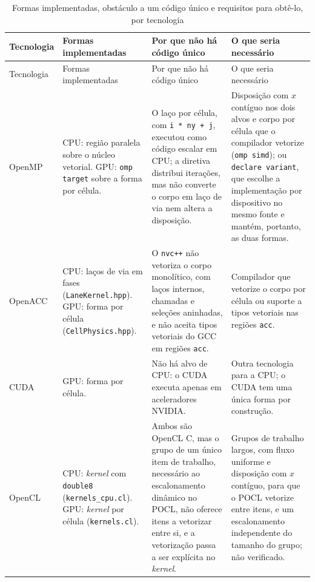 {\footnotesize
\begin{longtable}{>{\raggedright\arraybackslash}p{1.6cm}>{\raggedright\arraybackslash}p{3.0cm}>{\raggedright\arraybackslash}p{4.6cm}>{\raggedright\arraybackslash}p{4.4cm}}
    \caption{Formas implementadas, obstáculo a um código único e requisitos para obtê-lo, por tecnologia}\label{tab:forma-unica-tecnologias} \\
    \toprule
    Tecnologia & Formas implementadas & Por que não há código único & O que seria necessário \\
    \midrule
    \endfirsthead
    \toprule
    Tecnologia & Formas implementadas & Por que não há código único & O que seria necessário \\
    \midrule
    \endhead
    \bottomrule
    \endlastfoot
    OpenMP &
        CPU: região paralela sobre o núcleo vetorial. GPU: \texttt{omp target} sobre a forma por célula. &
        O laço por célula, com \texttt{i * ny + j}, executou como código escalar em CPU; a diretiva distribui iterações, mas não converte o corpo em laço de via nem altera a disposição. &
        Disposição com $x$ contíguo nos dois alvos e corpo por célula que o compilador vetorize (\texttt{omp simd}); ou \texttt{declare variant}, que escolhe a implementação por dispositivo no mesmo fonte e mantém, portanto, as duas formas. \\
    OpenACC &
        CPU: laços de via em fases (\texttt{LaneKernel.hpp}). GPU: forma por célula (\texttt{CellPhysics.hpp}). &
        O \texttt{nvc++} não vetoriza o corpo monolítico, com laços internos, chamadas e seleções aninhadas, e não aceita tipos vetoriais do GCC em regiões \texttt{acc}. &
        Compilador que vetorize o corpo por célula ou suporte a tipos vetoriais nas regiões \texttt{acc}. \\
    CUDA &
        GPU: forma por célula. &
        Não há alvo de CPU: o CUDA executa apenas em aceleradores NVIDIA. &
        Outra tecnologia para a CPU; o CUDA tem uma única forma por construção. \\
    OpenCL &
        CPU: \textit{kernel} com \texttt{double8} (\texttt{kernels\_cpu.cl}). GPU: \textit{kernel} por célula (\texttt{kernels.cl}). &
        Ambos são OpenCL C, mas o grupo de um único item de trabalho, necessário ao escalonamento dinâmico no POCL, não oferece itens a vetorizar entre si, e a vetorização passa a ser explícita no \textit{kernel}. &
        Grupos de trabalho largos, com fluxo uniforme e disposição com $x$ contíguo, para que o POCL vetorize entre itens, e um escalonamento independente do tamanho do grupo; não verificado. \\

\end{longtable}}
